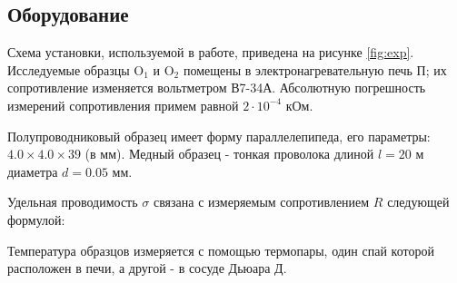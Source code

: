 \subsection*{Оборудование}

Схема установки, используемой в работе, приведена на рисунке \ref{fig:exp}. Исследуемые образцы O$_1$ и O$_2$ помещены в электронагревательную печь П; их сопротивление изменяется вольтметром В7-34А. Абсолютную погрешность измерений сопротивления примем равной $2\cdot10^{-4}$ кОм. 
    

Полупроводниковый образец имеет форму параллелепипеда, его параметры: $4.0 \times 4.0 \times 39$ (в мм). Медный образец - тонкая проволока длиной $l = 20$ м диаметра $d = 0.05$ мм.

Удельная проводимость $\sigma$ связана с измеряемым сопротивлением $R$ следующей формулой: 




Температура образцов измеряется с помощью термопары, один спай которой расположен в печи, а другой - в сосуде Дьюара Д. 
